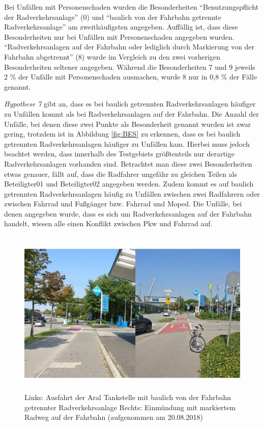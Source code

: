 Bei Unfällen mit Personenschaden wurden die Besonderheiten \enquote{Benutzungspflicht der Radverkehrsanlage} (0) und \enquote{baulich von der Fahrbahn getrennte Radverkehrsanlage} am zweithäufigsten angegeben. Auffällig ist, dass diese Besonderheiten nur bei Unfällen mit Personenschaden angegeben wurden. \enquote{Radverkehrsanlagen auf der Fahrbahn oder lediglich durch Markierung von der Fahrbahn abgetrennt} (8) wurde im Vergleich zu den zwei vorherigen Besonderheiten seltener angegeben. Während die Besonderheiten 7 und 9 jeweils 2 \% der Unfälle mit Personenschaden ausmachen, wurde 8 nur in 0,8 \% der Fälle genannt.

\textit{Hypothese 7} gibt an, dass es bei baulich getrennten Radverkehrsanlagen häufiger zu Unfällen kommt als bei Radverkehrsanlagen auf der Fahrbahn. Die Anzahl der Unfälle, bei denen diese zwei Punkte als Besonderheit genannt wurden ist zwar gering, trotzdem ist in Abbildung \ref{fig:BES} zu erkennen, dass es bei baulich getrennten Radverkehrsanlagen häufiger zu Unfällen  kam. Hierbei muss jedoch beachtet werden, dass innerhalb des Testgebiets größtenteils nur derartige Radverkehrsanlagen vorhanden sind. Betrachtet man diese zwei Besonderheiten etwas genauer, fällt auf, dass die Radfahrer ungefähr zu gleichen Teilen als Beteiligter01 und Beteiligter02 angegeben werden. Zudem kommt es auf baulich getrennten Radverkehrsanlagen häufig zu Unfällen zwischen zwei Radfahrern oder zwischen Fahrrad und Fußgänger bzw. Fahrrad und Moped. Die Unfälle, bei denen angegeben wurde, dass es sich um Radverkehrsanlagen auf der Fahrbahn handelt, wiesen alle einen Konflikt zwischen Pkw und Fahrrad auf.

\begin{savenotes}
	\begin{figure}[H]
		\centering
		\includegraphics[width=12cm,height=8cm]{figures/Lyonel_Feininger}
		\caption[Ausfahrt Aral Tankstelle und Einmündung Lyonel-Feininger-Straße]{Links: Ausfahrt der Aral Tankstelle mit baulich von der Fahrbahn getrennter Radverkehrsanlage Rechts: Einmündung mit markiertem Radweg auf der Fahrbahn (aufgenommen am 20.08.2018)}\label{fig:Lyonel-Feininger}
	\end{figure}
\end{savenotes}


